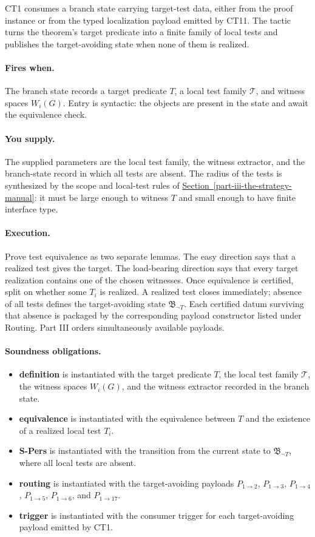 \documentclass[
  11pt,
]{article}
\providecommand{\tightlist}{%
  \setlength{\itemsep}{0pt}\setlength{\parskip}{0pt}}
\theoremstyle{definition}
\newcommand{\secref}[1]{\hyperref[#1]{Section~\ref*{#1}}}
\newcommand{\ctpar}[1]{\paragraph{#1.}}
\begin{document}
CT1 consumes a branch state carrying target-test data, either from the
proof instance or from the typed localization payload emitted by CT11.
The tactic turns the theorem's target predicate into a finite family of
local tests and publishes the target-avoiding state when none of them is
realized.

\ctpar{Fires when}
The branch state records a target predicate \(T\), a local test family
\(\mathcal T\), and witness spaces \(W_i(G)\).  Entry is syntactic: the
objects are present in the state and await the equivalence check.

\ctpar{You supply}
The supplied parameters are the local test family, the witness extractor,
and the branch-state record in which all tests are absent.  The radius of
the tests is synthesized by the scope and local-test rules of \secref{part-iii-the-strategy-manual}:
it must be large enough to witness \(T\) and small enough to have finite
interface type.

\ctpar{Execution}
Prove test equivalence as two separate lemmas.  The easy direction says
that a realized test gives the target.  The load-bearing direction says
that every target realization contains one of the chosen witnesses.  Once
equivalence is certified, split on whether some \(T_i\) is realized.  A
realized test closes immediately; absence of all tests defines the
target-avoiding state \(\mathfrak B_{\neg T}\).  Each certified datum
surviving that absence is packaged by the corresponding payload
constructor listed under Routing.  Part III orders simultaneously
available payloads.

\ctpar{Soundness obligations}
\begin{itemize}
\tightlist
\item \textbf{definition} is instantiated with the target predicate \(T\), the local test family \(\mathcal T\), the witness spaces \(W_i(G)\), and the witness extractor recorded in the branch state.
\item \textbf{equivalence} is instantiated with the equivalence between \(T\) and the existence of a realized local test \(T_i\).
\item \textbf{S-Pers} is instantiated with the transition from the current state to \(\mathfrak B_{\neg T}\), where all local tests are absent.
\item \textbf{routing} is instantiated with the target-avoiding payloads \(P_{1\to2}\), \(P_{1\to3}\), \(P_{1\to4}\), \(P_{1\to5}\), \(P_{1\to6}\), and \(P_{1\to17}\).
\item \textbf{trigger} is instantiated with the consumer trigger for each target-avoiding payload emitted by CT1.
\end{itemize}
\end{document}
